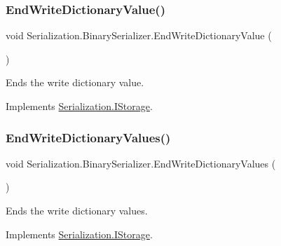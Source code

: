 \subsubsection{\texorpdfstring{End\+Write\+Dictionary\+Value()}{EndWriteDictionaryValue()}}
{\footnotesize\ttfamily void Serialization.\+Binary\+Serializer.\+End\+Write\+Dictionary\+Value (\begin{DoxyParamCaption}{ }\end{DoxyParamCaption})\hspace{0.3cm}{\ttfamily [inline]}}



Ends the write dictionary value. 



Implements \hyperlink{interface_serialization_1_1_i_storage_ab14d2fe3fc5d3ed7171435152b060bf2}{Serialization.\+I\+Storage}.

\mbox{\label{class_serialization_1_1_binary_serializer_a73fd29b68829c4662864e9f922800c1f}} 
\subsubsection{\texorpdfstring{End\+Write\+Dictionary\+Values()}{EndWriteDictionaryValues()}}
{\footnotesize\ttfamily void Serialization.\+Binary\+Serializer.\+End\+Write\+Dictionary\+Values (\begin{DoxyParamCaption}{ }\end{DoxyParamCaption})\hspace{0.3cm}{\ttfamily [inline]}}



Ends the write dictionary values. 



Implements \hyperlink{interface_serialization_1_1_i_storage_ad1d8b55f3ae8fa16cf2dc58103263999}{Serialization.\+I\+Storage}.

\mbox{\label{class_serialization_1_1_binary_serializer_a3fa0ec1f937e4009887ea69b42461c04}} 
